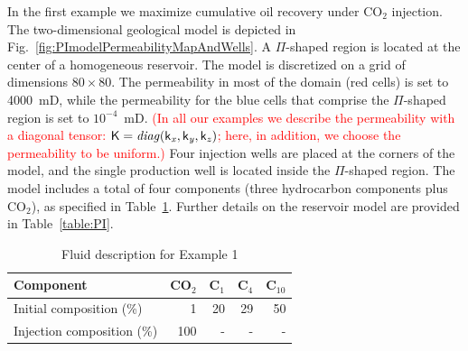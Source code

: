 \documentclass[twocolumn,numbook]{svjour3}          %
\newcommand{\red}[1]{\textcolor{red}{#1}}
\begin{document}
In the first example we maximize cumulative oil recovery under CO$_2$ injection. The two-dimensional geological model is depicted in Fig.~\ref{fig:PImodelPermeabilityMapAndWells}. A $\Pi$-shaped region is located at the center of a homogeneous reservoir. The model is discretized on a grid of dimensions $80\times80$. The permeability in most of the domain (red cells) is set to 4000~mD, while the permeability for the blue cells that comprise the $\Pi$-shaped region is set to $10^{-4}$~mD. \red{(In all our examples we describe the permeability with a diagonal tensor: $\mathsf{K} = \it{diag}(\mathsf{k}_x, \mathsf{k}_y, \mathsf{k}_z)$; here, in addition, we choose the permeability to be uniform.)}
 Four injection wells are placed at the corners of the model, and the single production well is located inside the $\Pi$-shaped region. The model includes a total of four components (three hydrocarbon  components plus CO$_2$), as specified in Table~\ref{table:fluidForPImodel}. Further details on the reservoir model are provided in Table~\ref{table:PI}.

%
\begin{table}
\centering
\caption{Fluid description for Example 1}
\begin{tabular}{|l|r|r|r|r|}
\hline
Component            & CO$_2$ & C$_1$ & C$_4$ & C$_{10}$    \\
\hline
Initial composition (\%)  & 1    & 20  & 29    & 50 \\
Injection composition (\%)& 100   & - & - & - \\
\hline
\end{tabular}
\label{table:fluidForPImodel}
\end{table}
%
\end{document}
